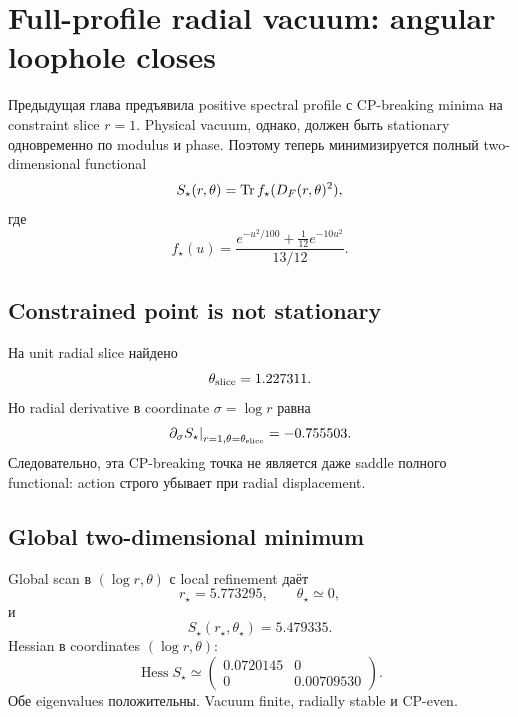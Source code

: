 \chapter{Full-profile radial vacuum: angular loophole closes}

Предыдущая глава предъявила positive spectral profile с CP-breaking minima на
constraint slice $r=1$. Physical vacuum, однако, должен быть stationary
одновременно по modulus и phase. Поэтому теперь минимизируется полный
two-dimensional functional
\begin{equation}
 S_\star(r,\theta)=\operatorname{Tr} f_\star(D_F(r,\theta)^2),
\end{equation}
где
\begin{equation}
 f_\star(u)
 =\frac{e^{-u^2/100}+\frac1{12}e^{-10u^2}}{13/12}.
\end{equation}

\section{Constrained point is not stationary}

На unit radial slice найдено
\begin{equation}
 \theta_{\rm slice}=1.227311.
\end{equation}
Но radial derivative в coordinate $\sigma=\log r$ равна
\begin{equation}
 \left.
 \partial_\sigma S_\star
 \right|_{r=1,\theta=\theta_{\rm slice}}
 =-0.755503.
\end{equation}
Следовательно, эта CP-breaking точка не является даже saddle полного
functional: action строго убывает при radial displacement.

\section{Global two-dimensional minimum}

Global scan в $(\log r,\theta)$ с local refinement даёт
\begin{equation}
 r_\star=5.773295,
 \qquad
 \theta_\star\simeq0,
\end{equation}
и
\begin{equation}
 S_\star(r_\star,\theta_\star)=5.479335.
\end{equation}
Hessian в coordinates $(\log r,\theta)$:
\begin{equation}
 \operatorname{Hess}S_\star
 \simeq
 \begin{pmatrix}
 0.0720145&0\\
 0&0.00709530
 \end{pmatrix}.
\end{equation}
Обе eigenvalues положительны. Vacuum finite, radially stable и CP-even.


